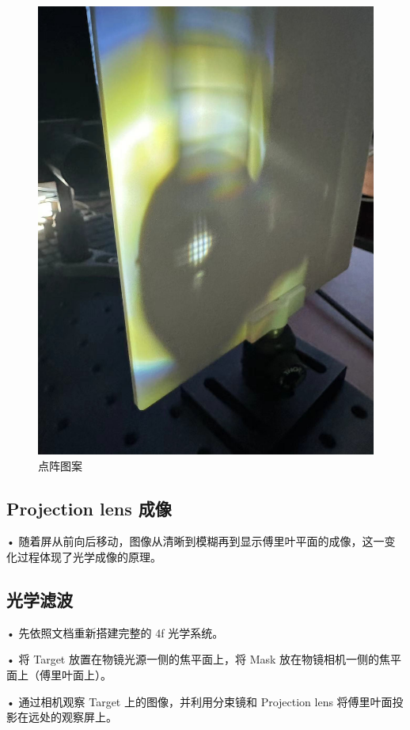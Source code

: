 \documentclass{ctexart}
\begin{document}
\begin{figure}[H]
\begin{minipage}[b]{0.2\textwidth}
    \includegraphics[width=\textwidth]{pictures/微信图片_20241010201031.jpg}
    \caption{点阵图案}
  \end{minipage}
\end{figure}
\subsection{Projection lens 成像}
• 随着屏从前向后移动，图像从清晰到模糊再到显示傅里叶平面的成像，这一变化过程体现了光学成像的原理。
\subsection{光学滤波}
• 先依照文档重新搭建完整的 4f 光学系统。

• 将 Target 放置在物镜光源一侧的焦平面上，将 Mask 放在物镜相机一侧的焦平面上（傅里叶面上）。

• 通过相机观察 Target 上的图像，并利用分束镜和 Projection lens 将傅里叶面投影在远处的观察屏上。
\end{document}
